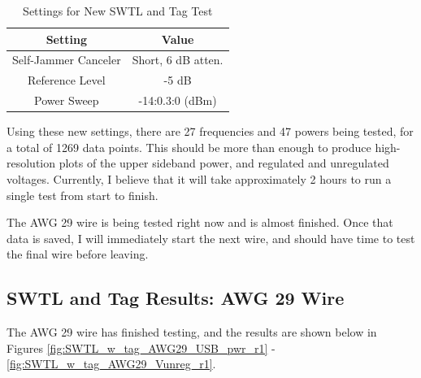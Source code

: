 \documentclass[12pt,onecolumn,titlepage]{article}
\begin{document}
\begin{table}[h!]
\centering
	\caption{Settings for New SWTL and Tag Test}
	\begin{tabular}{| c | c |}
	\hline
	{\bf Setting} & {\bf Value} \\ \hline
	Self-Jammer Canceler & Short, 6 dB atten.  \\ \hline
	Reference Level & -5 dB  \\ \hline
	Power Sweep & -14:0.3:0 (dBm)  \\ \hline
	\end{tabular}
\label{tab:SWTL_w_tag_test_settings}
\end{table}


Using these new settings, there are 27 frequencies and 47 powers being tested, for a total of 1269 data points. This should be more than enough to produce high-resolution plots of the upper sideband power, and regulated and unregulated voltages. Currently, I believe that it will take approximately 2 hours to run a single test from start to finish.

The AWG 29 wire is being tested right now and is almost finished. Once that data is saved, I will immediately start the next wire, and should have time to test the final wire before leaving.


\subsection{SWTL and Tag Results: AWG 29 Wire}
\indent \indent The AWG 29 wire has finished testing, and the results are shown below in Figures \ref{fig:SWTL_w_tag_AWG29_USB_pwr_r1}
- \ref{fig:SWTL_w_tag_AWG29_Vunreg_r1}.
\end{document}
